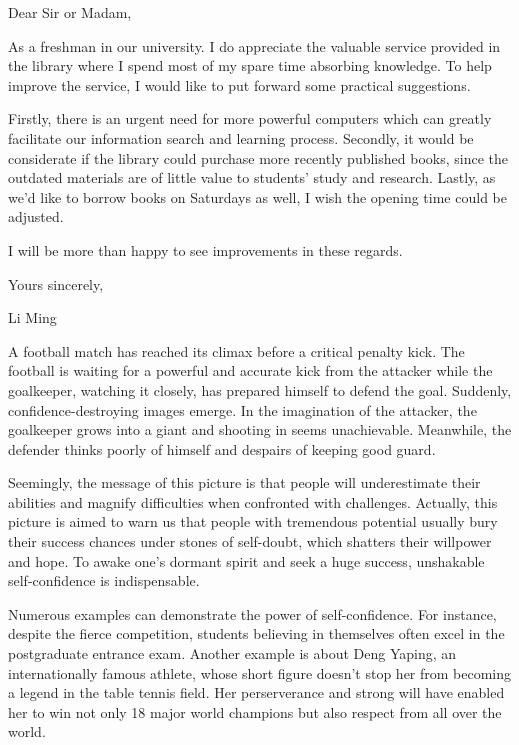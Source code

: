 Dear Sir or Madam,

As a freshman in our university. I do appreciate the valuable service provided in the library where I spend most of my spare time absorbing knowledge. To help improve the service, I would like to put forward some practical suggestions.

Firstly, there is an urgent need for more powerful computers which can greatly facilitate our information search and learning process. Secondly, it would be considerate if the library could purchase more recently published books, since the outdated materials are of little value to students' study and research. Lastly, as we'd like to borrow books on Saturdays as well, I wish the opening time could be adjusted.

I will be more than happy to see improvements in these regards.

\begin{flushright}Yours sincerely,

Li Ming\end{flushright}

A football match has reached its climax before a critical penalty kick. The football is waiting for a powerful and accurate kick from the attacker while the goalkeeper, watching it closely, has prepared himself to defend the goal. Suddenly, confidence-destroying images emerge. In the imagination of the attacker, the goalkeeper grows into a giant and shooting in seems unachievable. Meanwhile, the defender thinks poorly of himself and despairs of keeping good guard.

Seemingly, the message of this picture is that people will underestimate their abilities and magnify difficulties when confronted with challenges. Actually, this picture is aimed to warn us that people with tremendous potential usually bury their success chances under stones of self-doubt, which shatters their willpower and hope. To awake one's dormant spirit and seek a huge success, unshakable self-confidence is indispensable.

Numerous examples can demonstrate the power of self-confidence. For instance, despite the fierce competition, students believing in themselves often excel in the postgraduate entrance exam. Another example is about Deng Yaping, an internationally famous athlete, whose short figure doesn't stop her from becoming a legend in the table tennis field. Her perserverance and strong will have enabled her to win not only 18 major world champions but also respect from all over the world.